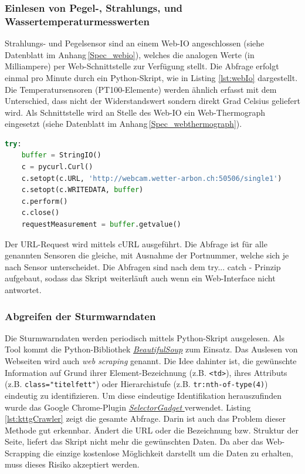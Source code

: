 \subsubsection{Einlesen von Pegel-, Strahlungs, und Wassertemperaturmesswerten}
Strahlungs- und Pegelsensor sind an einem Web-IO angeschlossen (siehe Datenblatt im Anhang\,\ref{Spec_webio}), welches die analogen Werte (in Milliampere) per Web-Schnittstelle zur Verfügung stellt. Die Abfrage erfolgt einmal pro Minute durch ein Python-Skript, wie in Listing \ref{lst:webIo} dargestellt. Die Temperatursensoren (PT100-Elemente) werden ähnlich erfasst mit dem Unterschied, dass nicht der Widerstandswert sondern direkt Grad Celsius geliefert wird. Als Schnittstelle wird an Stelle des Web-IO ein Web-Thermograph eingesetzt (siehe Datenblatt im Anhang\,\ref{Spec_webthermograph}).

\begin{lstlisting}[label=lst:webIo,caption=Python-Script zur Web-Abfrage des Pegel-Messwerts, language=python, style=py]
try:
    buffer = StringIO()
    c = pycurl.Curl()
    c.setopt(c.URL, 'http://webcam.wetter-arbon.ch:50506/single1')
    c.setopt(c.WRITEDATA, buffer)
    c.perform()
    c.close()
    requestMeasurement = buffer.getvalue()
\end{lstlisting}

\noindent
Der URL-Request wird mittels cURL ausgeführt. Die Abfrage ist für alle genannten Sensoren die gleiche, mit Ausnahme der Portnummer, welche sich je nach Sensor unterscheidet. Die Abfragen sind nach dem try... catch - Prinzip aufgebaut, sodass das Skript weiterläuft auch wenn ein Web-Interface nicht antwortet.



\subsubsection{Abgreifen der Sturmwarndaten} %
\label{kap:abgrSturmwarnung}
Die Sturmwarndaten werden periodisch mittels Python-Skript ausgelesen. Als Tool kommt die Python-Bibliothek \href{https://www.crummy.com/software/BeautifulSoup/}{\emph{BeautifulSoup}} zum Einsatz. Das Auslesen von Webseiten wird auch \emph{web scraping} genannt. Die Idee dahinter ist, die gewünschte Information auf Grund ihrer Element-Bezeichnung (z.B. \texttt{<td>}), ihres Attributs (z.B. \texttt{class="titelfett"}) oder Hierarchistufe (z.B. \texttt{tr:nth-of-type(4)}) eindeutig zu identifizieren. Um diese eindeutige Identifikation herauszufinden wurde das Google Chrome-Plugin \href{https://selectorgadget.com/}{\emph{SelectorGadget }} verwendet. Listing \ref{lst:kttgCrawler} zeigt die gesamte Abfrage. Darin ist auch das Problem dieser Methode gut erkennbar. Ändert die URL oder die Bezeichnung bzw. Struktur der Seite, liefert das Skript nicht mehr die gewünschten Daten. Da aber das Web-Scrapping die einzige kostenlose Möglichkeit darstellt um die Daten zu erhalten, muss dieses Risiko akzeptiert werden.


